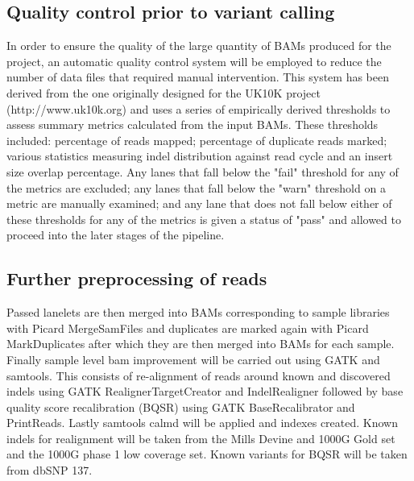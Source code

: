 \subsection{Quality control prior to variant calling}
In order to ensure the quality of the large quantity of BAMs produced for the project, an automatic quality control system will be employed to reduce the number of data files that required manual intervention. This system has been derived from the one originally designed for the UK10K project (http://www.uk10k.org) and uses a series of empirically derived thresholds to assess summary metrics calculated from the input BAMs. These thresholds included: percentage of reads mapped; percentage of duplicate reads marked; various statistics measuring indel distribution against read cycle and an insert size overlap percentage. Any lanes that fall below the "fail" threshold for any of the metrics are excluded; any lanes that fall below the "warn" threshold on a metric are manually examined; and any lane that does not fall below either of these thresholds for any of the metrics is given a status of "pass" and allowed to proceed into the later stages of the pipeline.

\subsection{Further preprocessing of reads}
Passed lanelets are then merged into BAMs corresponding to sample libraries with Picard MergeSamFiles and duplicates are marked again with Picard MarkDuplicates after which they are then merged into BAMs for each sample.  Finally sample level bam improvement will be carried out using GATK and samtools. This consists of re-alignment of reads around known and discovered indels using GATK RealignerTargetCreator and IndelRealigner followed by base quality score recalibration (BQSR) using GATK BaseRecalibrator and PrintReads. Lastly samtools calmd will be applied and indexes created. Known indels for realignment will be taken from the Mills Devine and 1000G Gold set and the 1000G phase 1 low coverage set. Known variants for BQSR will be taken from dbSNP 137.

